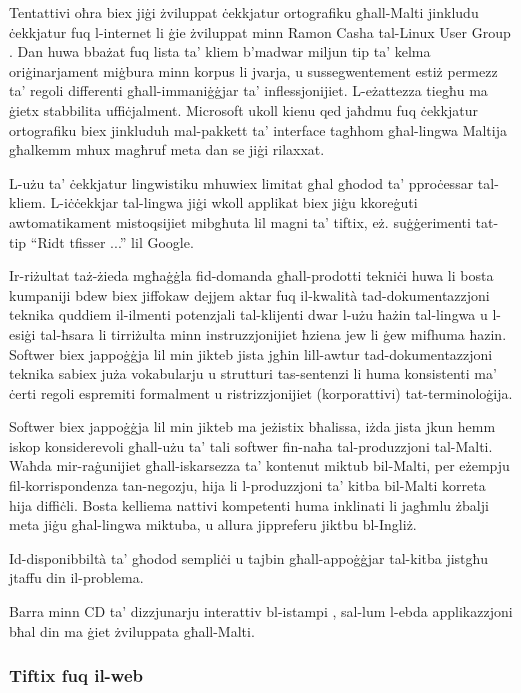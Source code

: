 \documentclass[]{../../metanetpaper}
\begin{document}
\begin{multicols}{2}
Tentattivi oħra biex jiġi żviluppat ċekkjatur ortografiku għall-Malti jinkludu ċekkjatur fuq l-internet li ġie żviluppat minn Ramon Casha tal-Linux User Group \cite{Linux-spellcheck1}. Dan huwa bbażat fuq lista ta’ kliem b’madwar miljun tip ta’ kelma oriġinarjament miġbura minn korpus li jvarja, u sussegwentement estiż permezz ta’ regoli differenti għall-immaniġġjar ta’ inflessjonijiet. L-eżattezza tiegħu ma ġietx stabbilita uffiċjalment. Microsoft ukoll kienu qed jaħdmu fuq ċekkjatur ortografiku biex jinkluduh mal-pakkett ta’ interface tagħhom għal-lingwa Maltija għalkemm mhux magħruf meta dan se jiġi rilaxxat.

L-użu ta’ ċekkjatur lingwistiku mhuwiex limitat għal għodod ta’  pproċessar tal-kliem. L-iċċekkjar tal-lingwa jiġi wkoll applikat biex jiġu kkoreġuti awtomatikament mistoqsijiet mibgħuta lil magni ta’ tiftix, eż. suġġerimenti tat-tip ``Ridt tfisser ...'' lil Google. 

Ir-riżultat taż-żieda mgħaġġla fid-domanda għall-prodotti tekniċi huwa li bosta kumpaniji bdew biex jiffokaw dejjem aktar fuq il-kwalità tad-dokumentazzjoni teknika quddiem il-ilmenti potenzjali tal-klijenti dwar l-użu ħażin tal-lingwa u l-esiġi tal-ħsara li tirriżulta minn instruzzjonijiet ħziena jew li ġew mifhuma ħazin. Softwer biex jappoġġja lil min jikteb jista jgħin lill-awtur tad-dokumentazzjoni teknika sabiex juża vokabularju u strutturi tas-sentenzi li huma konsistenti ma' ċerti regoli espremiti formalment u ristrizzjonijiet (korporattivi) tat-terminoloġija.

Softwer biex jappoġġja lil min jikteb ma jeżistix bħalissa, iżda jista jkun hemm iskop konsiderevoli għall-użu ta' tali softwer fin-naħa tal-produzzjoni tal-Malti. Waħda mir-raġunijiet għall-iskarsezza ta' kontenut miktub bil-Malti, per eżempju fil-korrispondenza tan-negozju, hija li l-produzzjoni ta' kitba bil-Malti korreta hija diffiċli. Bosta kelliema nattivi kompetenti huma inklinati li jagħmlu żbalji meta jiġu għal-lingwa miktuba, u allura jippreferu jiktbu bl-Ingliż.

Id-disponibbiltà ta' għodod sempliċi u tajbin għall-appoġġjar tal-kitba jistgħu jtaffu din il-problema.

Barra minn CD ta’ dizzjunarju interattiv bl-istampi \cite{Sciriha:1997}, sal-lum l-ebda applikazzjoni bħal din ma ġiet żviluppata għall-Malti.

\subsubsection{Tiftix fuq il-web}


\end{multicols}
\end{document}
